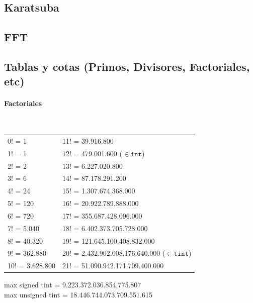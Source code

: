 \subsection{Karatsuba}

\subsection{FFT}
\subsection{Tablas y cotas (Primos, Divisores, Factoriales, etc)}
\paragraph{Factoriales} \ \\
\begin{tabular}{l|l}
0! =	1             & 11! = 39.916.800  \\
1! =	1             & 12! =	479.001.600	($\in \mathtt{int}$)\\
2! =	2             & 13! =	6.227.020.800	\\
3! =	6             & 14! =	87.178.291.200	\\
4! =	24            & 15! =	1.307.674.368.000	\\
5! =	120   			  & 16! =	20.922.789.888.000	\\
6! =	720           & 17! =	355.687.428.096.000	\\
7! =	5.040	        & 18! =	6.402.373.705.728.000	\\
8! =	40.320	      & 19! =	121.645.100.408.832.000	\\
9! =	362.880       & 20! =	2.432.902.008.176.640.000	($\in \mathtt{tint}$) \\
10! =	3.628.800     & 21! =	51.090.942.171.709.400.000
\end{tabular}
 
max signed tint = 9.223.372.036.854.775.807 \\
max unsigned tint = 18.446.744.073.709.551.615
